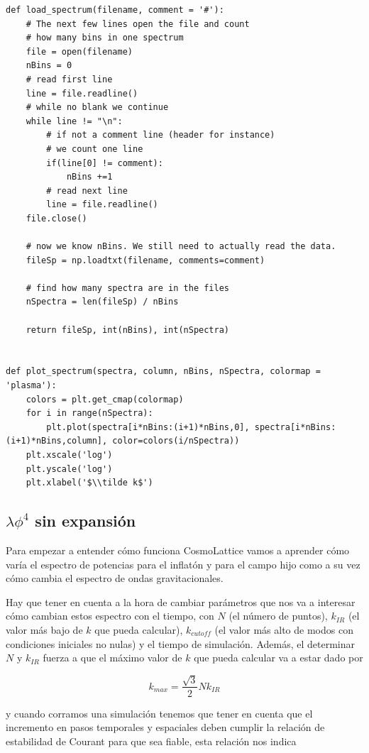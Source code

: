 \begin{lstlisting}[style = pythonStyle]
def load_spectrum(filename, comment = '#'):
    # The next few lines open the file and count
    # how many bins in one spectrum
    file = open(filename)
    nBins = 0
    # read first line
    line = file.readline()
    # while no blank we continue
    while line != "\n":
        # if not a comment line (header for instance)
        # we count one line
        if(line[0] != comment):
            nBins +=1
        # read next line
        line = file.readline()
    file.close()

    # now we know nBins. We still need to actually read the data.
    fileSp = np.loadtxt(filename, comments=comment)

    # find how many spectra are in the files
    nSpectra = len(fileSp) / nBins

    return fileSp, int(nBins), int(nSpectra)


def plot_spectrum(spectra, column, nBins, nSpectra, colormap = 'plasma'):
    colors = plt.get_cmap(colormap)
    for i in range(nSpectra):
        plt.plot(spectra[i*nBins:(i+1)*nBins,0], spectra[i*nBins:(i+1)*nBins,column], color=colors(i/nSpectra))
    plt.xscale('log')
    plt.yscale('log')
    plt.xlabel('$\\tilde k$')
\end{lstlisting}

\subsection{$\lambda \phi^4$ sin expansión}

Para empezar a entender cómo funciona CosmoLattice vamos a aprender cómo varía el espectro de potencias para el inflatón y para el campo hijo como a su vez cómo cambia el espectro de ondas gravitacionales.

Hay que tener en cuenta a la hora de cambiar parámetros que nos va a interesar cómo cambian estos espectro con el tiempo, con $N$ (el número de puntos), $k_{IR}$ (el valor más bajo de $k$ que pueda calcular), $k_{cutoff}$ (el valor más alto de modos con condiciones iniciales no nulas) y el tiempo de simulación. Además, el determinar $N$ y $k_{IR}$ fuerza a que el máximo valor de $k$ que pueda calcular va a estar dado por 

\begin{equation}
    k_{max} = \frac{\sqrt{3}}{2} N k_{IR}
\end{equation}

\noindent
y cuando corramos una simulación tenemos que tener en cuenta que el incremento en pasos temporales y espaciales deben cumplir la relación de estabilidad de Courant para que sea fiable, esta relación nos indica

